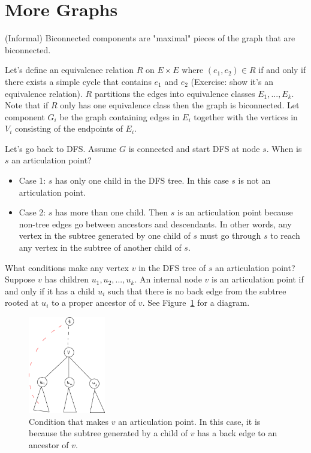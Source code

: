 
\section{More Graphs}

\begin{definition}
    (Informal) Biconnected components are "maximal" pieces of the
    graph that are biconnected.
\end{definition}

Let's define an equivalence relation $R$ on $E \times E$ where
$(e_1, e_2) \in R$ if and only if there exists a simple cycle that
contains $e_1$ and $e_2$ (Exercise: show it's an equivalence
relation). $R$ partitions the edges into equivalence classes $E_1,
..., E_k$. Note that if $R$ only has one equivalence class then the
graph is biconnected. Let component $G_i$ be the graph containing edges in
$E_i$ together with the vertices in $V_i$ consisting of the endpoints
of $E_i$.

Let's go back to DFS. Assume $G$ is connected and start DFS at node
$s$. When is $s$ an articulation point?

\begin{itemize}
    \item Case 1: $s$ has only one child in the DFS tree. In this case
    $s$ is not an articulation point.
    \item Case 2: $s$ has more than one child. Then $s$ is an
    articulation point because non-tree edges go between ancestors and
    descendants. In other words, any vertex in the subtree
    generated by one child of $s$ must
    go through $s$ to reach any vertex in the subtree of another
    child of $s$.
\end{itemize}

What conditions make any vertex $v$ in the DFS tree of $s$ an
articulation point? Suppose $v$ has children $u_1, u_2, ..., u_k$.
An internal node $v$ is an articulation point if and only if
it has a child $u_i$ such that there is no back edge from the subtree
rooted at $u_i$ to a proper ancestor of $v$. See Figure~\ref{fig:articulation} for a diagram.

\begin{figure}
    \centering
    \includegraphics[width=0.3\textwidth]{figures/articulation.jpeg}
    \caption{Condition that makes $v$ an articulation point. In this
    case, it is because the subtree generated by a child of $v$ has a
    back edge to an ancestor of $v$.}
    \label{fig:articulation}
\end{figure}

